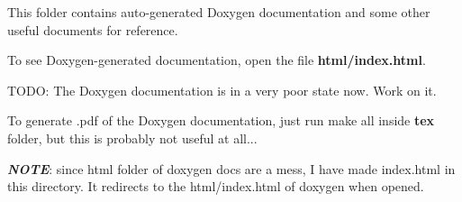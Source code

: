 This folder contains auto-\/generated Doxygen documentation and some other useful documents for reference.

To see Doxygen-\/generated documentation, open the file {\bfseries{html/index.\+html}}.

T\+O\+DO\+: The Doxygen documentation is in a very poor state now. Work on it.

To generate .pdf of the Doxygen documentation, just run {\ttfamily make all} inside {\bfseries{tex}} folder, but this is probably not useful at all...

{\itshape {\bfseries{N\+O\+TE}}}\+: since html folder of doxygen docs are a mess, I have made {\ttfamily index.\+html} in this directory. It redirects to the {\ttfamily html/index.\+html} of doxygen when opened. 